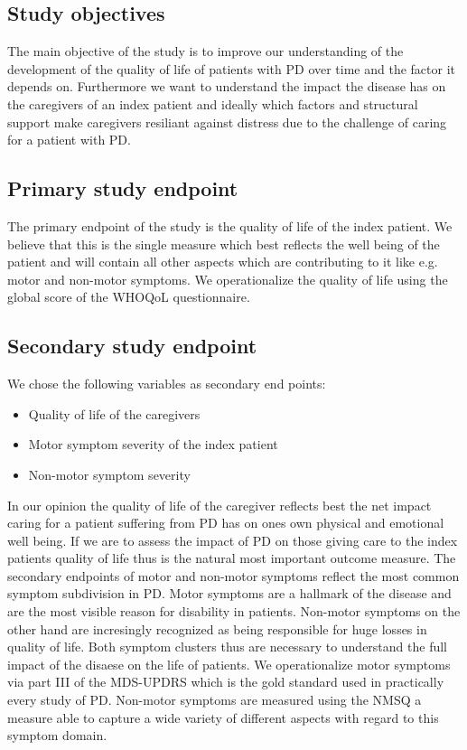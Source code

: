 \subsection{Study objectives}
The main objective of the study is to improve our understanding of the development of the quality of life of patients with \ac{PD} over time and the factor it depends on. Furthermore we want to understand the impact the disease has on the caregivers of an index patient and ideally which factors and structural support make caregivers resiliant against distress due to the challenge of caring for a patient with \ac{PD}.

\subsection{Primary study endpoint}
The primary endpoint of the study is the quality of life of the index patient. We believe that this is the single measure which best reflects the well being of the patient and will contain all other aspects which are contributing to it like e.g. motor and non-motor symptoms. We operationalize the quality of life using the global score of the \ac{WHOQoL} questionnaire.

\subsection{Secondary study endpoint}
We chose the following variables as secondary end points: 
\begin{itemize}
  \item Quality of life of the caregivers
  \item Motor symptom severity of the index patient
  \item Non-motor symptom severity
\end{itemize}
In our opinion the quality of life of the caregiver reflects best the net impact caring for a patient suffering from \ac{PD} has on ones own physical and emotional well being. If we are to assess the impact of \ac{PD} on those giving care to the index patients quality of life thus is the natural most important outcome measure. The secondary endpoints of motor and non-motor symptoms reflect the most common symptom subdivision in \ac{PD}. Motor symptoms are a hallmark of the disease and are the most visible reason for disability in patients. Non-motor symptoms on the other hand are incresingly recognized as being responsible for huge losses in quality of life. Both symptom clusters thus are necessary to understand the full impact of the disaese on the life of patients. We operationalize motor symptoms via part III of the \ac{MDS-UPDRS} which is the gold standard used in practically every study of \ac{PD}. Non-motor symptoms are measured using the \ac{NMSQ} a measure able to capture a wide variety of different aspects with regard to this symptom domain.


